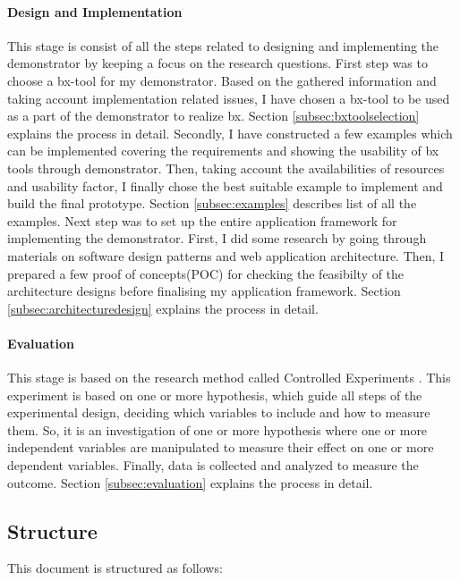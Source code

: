 \paragraph{Design and Implementation}
This stage is consist of all the steps related to designing and implementing the demonstrator by keeping a focus on the research questions.
\newline\newline First step was to choose a bx-tool for my demonstrator. Based on the gathered information and taking account implementation related issues, I have chosen a bx-tool to be used as a part of the demonstrator to realize bx. Section \ref{subsec:bxtoolselection} explains the process in detail.
\newline\newline Secondly, I have constructed a few examples which can be implemented covering the requirements and showing the usability of bx tools through demonstrator. Then, taking account the availabilities of resources and usability factor, I finally chose the best suitable example to implement and build the final prototype. Section \ref{subsec:examples} describes list of all the examples.
\newline\newline Next step was to set up the entire application framework for implementing the demonstrator. First, I did some research by going through materials on software design patterns and web application architecture. Then, I prepared a few proof of concepts(POC) for checking the feasibilty of the architecture designs before finalising my application framework. Section \ref{subsec:architecturedesign} explains the process in detail.

\paragraph{Evaluation} 
This stage is based on the research method called Controlled Experiments \cite{semethods}. This experiment is based on one or more hypothesis, which guide all steps of the experimental design, deciding which variables to include and how to measure them. So, it is an investigation of one or more hypothesis where one or more independent variables are manipulated to measure their effect on one or more
dependent variables. Finally, data is collected and analyzed to measure the outcome. Section \ref{subsec:evaluation} explains the process in detail.

\subsection{Structure}\label{subsec:structure}
This document is structured as follows: 

